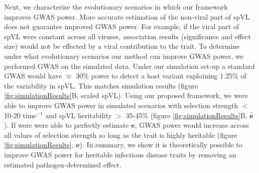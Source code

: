 \documentclass[]{article}
\begin{document}
\begin{doublespace}
Next, we characterize the evolutionary scenarios in which our framework improves GWAS power. More accurate estimation of the non-viral part of spVL does not guarantee improved GWAS power. For example, if the viral part of spVL were constant across all viruses, association results (significance and effect size) would not be effected by a viral contribution to the trait. To determine under what evolutionary scenarios our method can improve GWAS power, we performed GWAS on the simulated data. Under our simulation set-up a standard GWAS would have $\approx$ 30\% power to detect a host variant explaining 1.25\% of the variability in spVL. This matches simulation results (figure \ref{fig:simulationResults}B, scaled spVL). Using our proposed framework, we were able to improve GWAS power in simulated scenarios with selection strength $<$ 10-20 time$^{-1}$ and spVL heritability $>$ 35-45\% (figure \ref{fig:simulationResults}B, $\bm{\hat{e}}$). If were were able to perfectly estimate $\bm{e}$, GWAS power would increase across all values of selection strength so long as the trait is highly heritable (figure \ref{fig:simulationResults}, $\bm{e}$). In summary, we show it is theoretically possible to improve GWAS power for heritable infectious disease traits by removing an estimated pathogen-determined effect.


\end{doublespace}
\end{document}
